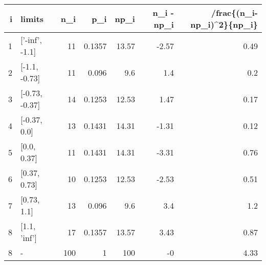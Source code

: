 \begin{tabular}{rlrrrrr}
\hline
   i & limits         &   n\_i &    p\_i &   np\_i &   n\_i - np\_i &   /frac\{(n\_i-np\_i)\^{}2\}\{np\_i\} \\
\hline
   1 & ['-inf', -1.1] &    11 & 0.1357 &  13.57 &        -2.57 &                        0.49 \\
   2 & [-1.1, -0.73]  &    11 & 0.096  &   9.6  &         1.4  &                        0.2  \\
   3 & [-0.73, -0.37] &    14 & 0.1253 &  12.53 &         1.47 &                        0.17 \\
   4 & [-0.37, 0.0]   &    13 & 0.1431 &  14.31 &        -1.31 &                        0.12 \\
   5 & [0.0, 0.37]    &    11 & 0.1431 &  14.31 &        -3.31 &                        0.76 \\
   6 & [0.37, 0.73]   &    10 & 0.1253 &  12.53 &        -2.53 &                        0.51 \\
   7 & [0.73, 1.1]    &    13 & 0.096  &   9.6  &         3.4  &                        1.2  \\
   8 & [1.1, 'inf']   &    17 & 0.1357 &  13.57 &         3.43 &                        0.87 \\
   8 & -              &   100 & 1      & 100    &        -0    &                        4.33 \\
\hline
\end{tabular}